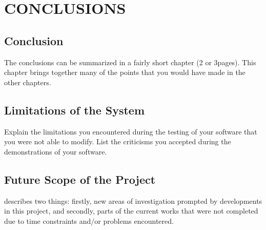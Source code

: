 
\chapter{CONCLUSIONS} %

\label{Chapter5} %



\section{Conclusion}
The conclusions can be summarized in a fairly short chapter (2 or 3pages). This chapter brings together many of the points that you would have made in the other chapters.

\section{Limitations of the System}
Explain the limitations you encountered during the testing of your software that you were not able to modify. List the criticisms you accepted during the demonstrations of your software.

\section{Future Scope of the Project}
describes two things: firstly, new areas of investigation prompted by developments in this project, and secondly, parts of the current works that were not completed due to time constraints and/or problems encountered.